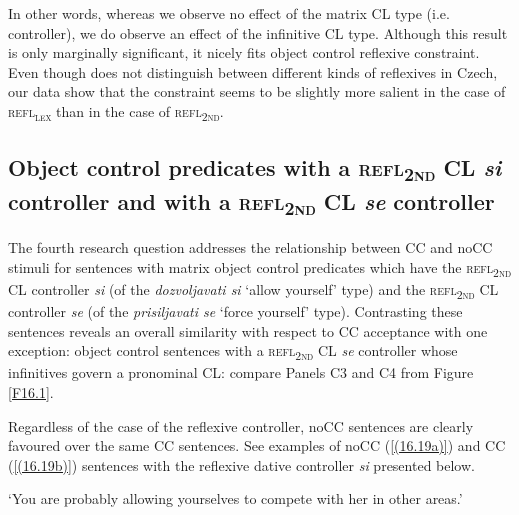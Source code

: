 \noindent In other words, whereas we observe no effect of the matrix CL type (i.e. controller), we do observe an effect of the infinitive CL type. Although this result is only marginally significant, it nicely fits \citet[][129f]{Hana07} object control reflexive constraint. Even though \citet[][]{Hana07} does not distinguish between different kinds of reflexives in Czech, our data show that the constraint seems to be slightly more salient in the case of \textsc{refl\textsubscript{\textsc{lex}}} than in the case of \textsc{refl\textsubscript{2nd}}. 

\subsection{Object control predicates with a \textsc{refl\textsubscript{2nd}} CL \textit{si} controller and with a \textsc{refl\textsubscript{2nd}} CL \textit{se} controller}
\label{Object control predicates with a refl2nd CL si controller and with a refl2nd CL se controller}

The fourth research question addresses the relationship between CC and noCC stimuli for sentences with matrix object control predicates which have the \textsc{refl\textsubscript{2nd}} CL controller \textit{si} (of the \textit{dozvoljavati si} ‘allow yourself’ type) and the \textsc{refl\textsubscript{2nd}} CL controller \textit{se} (of the \textit{prisiljavati se} ‘force yourself’ type). Contrasting these sentences reveals an overall similarity with respect to CC acceptance with one exception: object control sentences with a \textsc{refl\textsubscript{2nd}} CL \textit{se} controller whose infinitives govern a pronominal CL: compare Panels C3 and C4 from Figure \ref{F16.1}.

Regardless of the case of the reflexive controller, noCC sentences are clearly favoured over the same CC sentences. See examples of noCC (\ref{(16.19a)}) and CC (\ref{(16.19b)}) sentences with the reflexive dative controller \textit{si} presented below. 

\begin{exe}\ex\begin{xlist}
\end{xlist}
\glt ‘You are probably allowing yourselves to compete with her in other areas.’ 
\end{exe}


